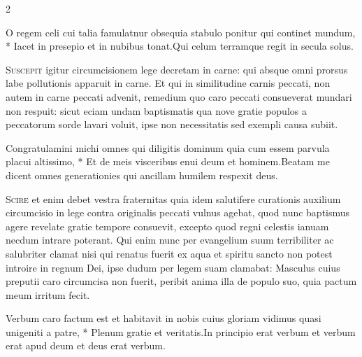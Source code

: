 \begin{multicols*}{2}
\begin{responsory}
{O regem celi cui talia famulatnur obsequia stabulo ponitur qui continet mundum, * Iacet in presepio et in nubibus tonat.}{Qui celum terramque regit in secula solus.}
\end{responsory}%
\lettrine[lines=2]{\zallmancaps \color{Red} S}{uscepit} igitur circumcisionem lege decretam in carne: qui absque omni prorsus labe pollutionis apparuit in carne. Et qui in similitudine carnis peccati, non autem in carne peccati advenit, remedium quo caro peccati consueverat mundari non respuit: sicut eciam undam baptismatis qua nove gratie populos a peccatorum sorde lavari voluit, ipse non necessitatis sed exempli causa subiit.
\begin{responsory}
{Congratulamini michi omnes qui diligitis dominum quia cum essem parvula placui altissimo, * Et de meis visceribus enui deum et hominem.}{Beatam me dicent omnes generationies qui ancillam humilem respexit deus.}
\end{responsory}%
\lettrine[lines=2]{\zallmancaps \color{Blue} S}{cire} et enim debet vestra fraternitas quia idem salutifere curationis auxilium circumcisio in lege contra originalis peccati vulnus agebat, quod nunc baptismus agere revelate gratie tempore consuevit, excepto quod regni celestis ianuam necdum intrare poterant. Qui enim nunc per evangelium suum terribiliter ac salubriter clamat nisi qui renatus fuerit ex aqua et spiritu sancto non potest introire in regnum Dei, ipse dudum per legem suam clamabat: Masculus cuius preputii caro circumcisa non fuerit, peribit anima illa de populo suo, quia pactum meum irritum fecit.
\begin{responsory-doxology}
{Verbum caro factum est et habitavit in nobis cuius gloriam vidimus quasi unigeniti a patre, * Plenum gratie et veritatis.}{In principio erat verbum et verbum erat apud deum et deus erat verbum.}
\end{responsory-doxology}%

\end{multicols*}
